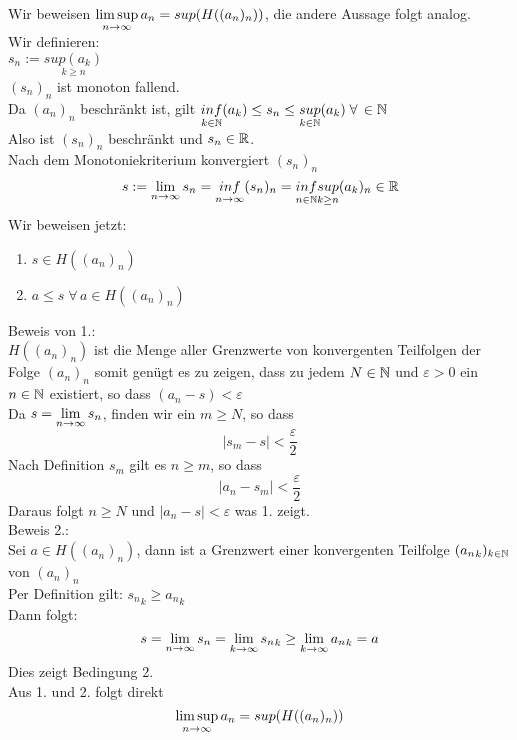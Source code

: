 \documentclass[../ana1u.tex]{subfiles}
\begin{document}
\begin{bew}
    Wir beweisen \(\limsup\limits_{n\rightarrow\infty} a_n = sup(H((a_n)_n)) \), die andere Aussage folgt analog. \\
    Wir definieren: \\
    \(s_n := \underset{k \geq n}{sup(a_k)} \) \\
    \((s_n)_n \) ist monoton fallend. \\
    Da \((a_n)_n \) beschränkt ist, gilt \(\underset{k \in \mathbb{N}}{inf}(a_k) \leq s_n 
    \leq \underset{k \in \mathbb{N}}{sup}(a_k) \; \forall \, \in \mathbb{N} \) \\
    Also ist \((s_n)_n \) beschränkt und \(s_n \in \mathbb{R} \). \\
    Nach dem Monotoniekriterium konvergiert \((s_n)_n \)
    \[s := \lim\limits_{n\rightarrow\infty} s_n = \underset{n \rightarrow \infty}{inf}(s_n)_n 
    = \underset{n \in \mathbb{N}}{inf}\underset{k \geq n}{sup}(a_k)_n \in \mathbb{R}\]
    Wir beweisen jetzt:
    \begin{enumerate}
        \item \(s \in H((a_n)_n) \)
        \item \(a \leq s \; \forall \, a \in H((a_n)_n) \)
    \end{enumerate}
    Beweis von 1.: \\
    \(H((a_n)_n) \) ist die Menge aller Grenzwerte von konvergenten Teilfolgen der Folge 
    \((a_n)_n \) somit genügt es zu zeigen, dass zu jedem \(N \in \mathbb{N} \) und 
    \(\varepsilon > 0 \) ein \(n \in \mathbb{N} \) existiert, so dass \((a_n - s) < \varepsilon \) \\
    Da \(s = \lim\limits_{n\rightarrow\infty} s_n \), finden wir ein \(m \geq N \), so dass 
    \[|s_m - s| < \frac{\varepsilon}{2} \]
    Nach Definition \(s_m \) gilt es \(n \geq m \), so dass
    \[|a_n - s_m| < \frac{\varepsilon}{2} \]
    Daraus folgt \(n \geq N \) und \(|a_n - s| < \varepsilon \) was 1. zeigt. \\
    Beweis 2.: \\
    Sei \(a \in H((a_n)_n) \), dann ist a Grenzwert einer konvergenten Teilfolge 
    \(({a_n}_k)_{k \in \mathbb{N}}\) von \((a_n)_n \) \\
    Per Definition gilt: \({s_n}_k \geq {a_n}_k \) \\
    Dann folgt:
    \[s = \lim\limits_{n\rightarrow\infty} s_n = \lim\limits_{k\rightarrow\infty} {s_n}_k \geq \lim\limits_{k\rightarrow\infty} {a_n}_k = a \]
    Dies zeigt Bedingung 2. \\
    Aus 1. und 2. folgt direkt
    \[\limsup\limits_{n\rightarrow\infty} a_n = sup(H((a_n)_n)) \]
\end{bew}
\end{document}
